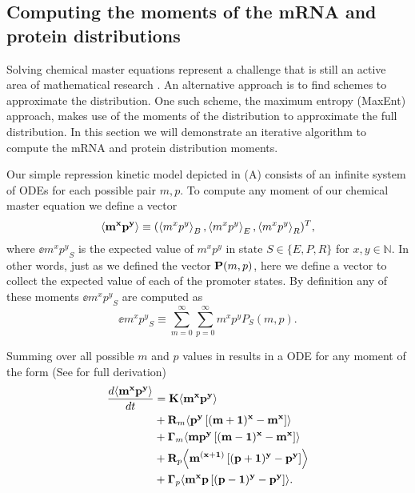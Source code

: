 \subsection{Computing the moments of the mRNA and protein distributions}
\label{sec_moments}

Solving chemical master equations represent a challenge that is still an active
area of mathematical research \cite{Dinh2016}. An alternative approach is to
find schemes to approximate the distribution. One such scheme, the maximum
entropy (MaxEnt) approach, makes use of the moments of the distribution to
approximate the full distribution. In this section we will demonstrate an
iterative algorithm to compute the mRNA and protein distribution moments.

Our simple repression kinetic model depicted in (A)
consists of an infinite system of ODEs for each possible pair $m, p$. To
compute any moment of our chemical master equation we define a vector
\begin{equation}
	\left\langle \mathbf{m^x p^y} \right\rangle \equiv (\left\langle m^x p^y \right\rangle_B, \left\langle m^x p^y \right\rangle_E, \left\langle m^x p^y \right\rangle_R)^T,
\end{equation}
where $\ee{m^x p^y}_S$ is the expected value of $m^x p^y$ in state $S \in \{E,
P, R\}$ for $x, y \in \mathbb{N}$. In other words, just as we defined the vector
$\mathbf{P}(m, p)$, here we define a vector to collect the expected value of each of
the promoter states. By definition any of these moments $\ee{m^x p^y}_S$ are
computed as
\begin{equation}
  \ee{m^x p^y}_S \equiv \sum_{m=0}^\infty \sum_{p=0}^\infty m^x p^y P_S(m, p).
  \label{eq_mom_def}
\end{equation}

Summing over all possible $m$ and $p$ values in  results in
a ODE for any moment of the form (See  for full derivation)
\begin{equation}
  \begin{aligned}
    {d{\mathbf{\left\langle m^x p^y \right\rangle}} \over dt} &=
    \mathbf{K} \mathbf{\left\langle m^x p^y \right\rangle}\\
    &+ \mathbf{R}_m \mathbf{\left\langle p^y \left[ (m + 1)^x -m^x \right] \right\rangle}\\
    &+ \mathbf{\Gamma}_m \mathbf{\left\langle m p^y \left[ (m - 1)^x - m^x \right] \right\rangle}\\
    &+ \mathbf{R}_p \mathbf{\left\langle m^{(x + 1)} \left[ (p + 1)^y - p^y \right] \right\rangle}\\
    &+ \mathbf{\Gamma}_p \mathbf{\left\langle m^x p \left[ (p - 1)^y - p^y \right] \right\rangle}.
    \label{eq_gral_mom}
  \end{aligned}
\end{equation}

